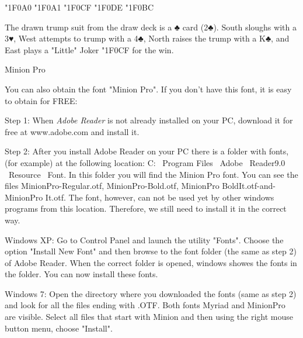 \documentclass{article}
\begin{document}
\symbola
{\Huge
\char"1F0A0 \char"1F0A1 \char"1F0CF \char"1F0DE \char"1F0BC}
\bigskip

\normalsize

The drawn trump suit from the draw deck is a ♣ card (2♣). South sloughs with a 3♥, West attempts to trump with a 4♣, North raises the trump with a K♣, and  East plays a "Little" Joker \char"1F0CF for the win.


\lipsum

Minion Pro

You can also obtain the font "Minion Pro".
If you don't have this font, it is easy to obtain for FREE:

Step 1: When \textit{Adobe Reader} is not already installed on your PC, download it for free at www.adobe.com and install it.

Step 2: After you install Adobe Reader on your PC there is a folder with fonts, (for example) at the following location: C: \ Program Files \ Adobe \ Reader9.0 \ Resource \ Font. 
In this folder you will find the Minion Pro font.
You can see the files MinionPro-Regular.otf, MinionPro-Bold.otf, MinionPro BoldIt.otf-and-MinionPro It.otf.
The font, however, can not be used yet by other windows programs from this location. Therefore, we still need to install it in the correct way.

Windows XP: Go to Control Panel and launch the utility "Fonts". Choose the option "Install New Font" and then browse to the font folder (the same as step 2) of Adobe Reader. When the correct folder is opened, windows showes the fonts in the folder. You can now install these fonts.

Windows 7: Open the directory where you downloaded the fonts (same as step 2) and look for all the files ending with .OTF. Both fonts Myriad and  MinionPro are visible. Select all files that start with Minion and then using the right mouse button menu, choose "Install".
\end{document}
